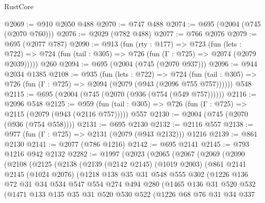 \begin{lexlean}{RustCore}
\begin{coremodule}
{\begin{coremodule}
{{{{{{{{{@2069 := @910 @2050 @488
@2070 := @747 @488
@2074 := @695 (@2004 (@745 (@2070 @760)))
@2076 := @2029 (@782 @488)
@2077 := @766 @2076
@2079 := @695 (@2077 @787)
@2090 := @913
    (fun (rty : @177) =>
    @723
      (fun (lets : @722) =>
      @724 (fun (tail : @305) => @726 (fun (Γ : @725) => @2074 (@2079 @2039)))))
    @260
@2094 := @695 (@2004 (@745 (@2070 @937)))
@2096 := @944 @2034 @1385
@2108 := @935
    (fun (lets : @722) =>
    @724 (fun (tail : @305) => @726 (fun (Γ : @725) => @2094 (@2079 (@943 (@2096 @755 @757))))))
    @548
@2115 := @695 (@2004 (@745 (@2070 (@936 (@754 (@549 @757))))))
@2116 := @2096 @548
@2125 := @959 (fun (tail : @305) => @726 (fun (Γ : @725) => @2115 (@2079 (@943 (@2116 @757))))) @557
@2130 := @2004 (@745 (@2070 (@936 (@754 @558))))
@2131 := @695 @2130
@2132 := @2116 @557
@2138 := @977 (fun (Γ : @725) => @2131 (@2079 (@943 @2132))) @1216
@2139 := @861 @2130
@2141 := @2077 (@786 @1216)
@2142 := @695 @2141
@2145 := @793 @1216 @942 @2132
@2282 := @1997
    (@2023
      (@2065
        (@2067
          (@2069
            (@2090
              (@2108
                (@2125
                  (@2138
                    (@2139
                      (@2142 @2145)
                      (@1019 @2003)
                      (@861
                        @2141
                        @2145
                        (@1024 @2076)
                        (@1218
                          @138
                          @35
                          @31
                          @548
                          @555
                          @302
                          (@1226
                            @136
                            @72
                            @31
                            @34
                            @534
                            @547
                            @554
                            @274
                            @494
                            @280
                            (@1465
                              @136
                              @31
                              @520
                              @532
                              (@1471
                                @133
                                @135
                                @35
                                @31
                                @520
                                @530
                                @522
                                (@1226
                                  @68
                                  @76
                                  @31
                                  @34
                                  @337
}}}}}}}}}
\end{coremodule}}
\end{coremodule}
\end{lexlean}
